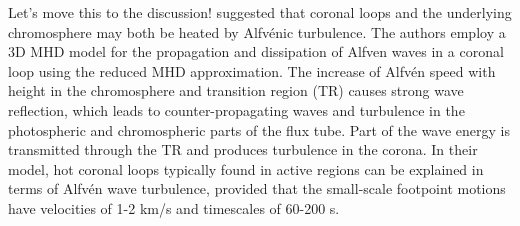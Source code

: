 \documentclass{aa}
\begin{document}
{{\color{blue} Let's move this to the discussion!}
\cite{vanballegooijen+al:2017} suggested that coronal loops and the underlying chromosphere may both be heated by Alfv\'enic turbulence. The authors employ a 3D MHD model for the propagation and dissipation of Alfven waves in a coronal loop using the reduced MHD approximation. 
The increase of Alfv\'en speed with height in the chromosphere and transition region (TR) causes strong wave reflection, which leads to counter-propagating waves and turbulence in the photospheric and chromospheric parts of the flux tube. Part of the wave energy is transmitted through the TR and produces turbulence in the corona. In their model, hot coronal loops typically found in active regions can be explained in terms of Alfv\'en wave turbulence, provided that the small-scale footpoint motions have velocities of 1-2 km/s and timescales of 60-200 s.\\ %




}
\end{document}
